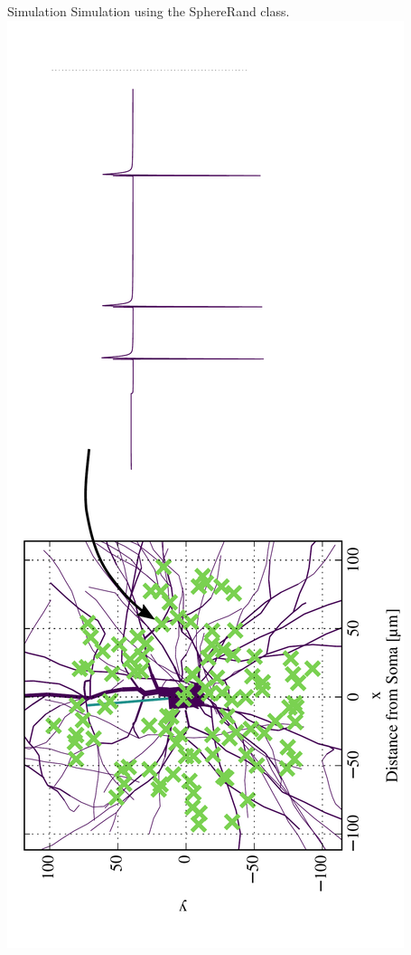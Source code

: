 \documentclass{beamer}
\begin{document}
\begin{frame}{Simulation}
    Simulation using the SphereRand class.
    \centering
    \includegraphics[angle=-90,width=\textwidth]{images/electrodes.pdf}
\end{frame}
\end{document}

